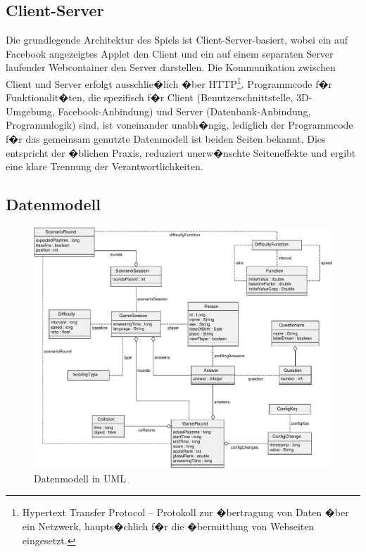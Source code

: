 \documentclass[a4paper,12pt]{scrartcl}
\begin{document}
\subsection{Client-Server}
Die grundlegende Architektur des Spiels ist Client-Server-basiert, wobei ein auf
Facebook angezeigtes Applet den Client und ein auf einem separaten Server laufender
Webcontainer den Server darstellen. Die Kommunikation zwischen Client und Server erfolgt
ausschlie�lich �ber HTTP\footnote{Hypertext Transfer Protocol -- Protokoll zur
�bertragung von Daten �ber ein Netzwerk, haupts�chlich f�r die �bermittlung
von Webseiten eingesetzt.}. Programmcode f�r Funktionalit�ten, die spezifisch
f�r Client (Benutzerschnittstelle, 3D-Umgebung, Facebook-Anbindung) und Server (Datenbank-Anbindung, Programmlogik) sind, ist voneinander unabh�ngig, lediglich der Programmcode f�r das gemeinsam genutzte Datenmodell ist beiden Seiten bekannt. Dies entspricht der �blichen Praxis, reduziert unerw�nschte Seiteneffekte und ergibt eine klare Trennung der
Verantwortlichkeiten.

\clearpage

\subsection{Datenmodell}

\begin{figure}[htp]
\begin{center}
  \includegraphics[width=\textwidth]{uml}
  \caption{Datenmodell in UML}
  \label{fig:uml}
\end{center}
\end{figure} 
\end{document}
